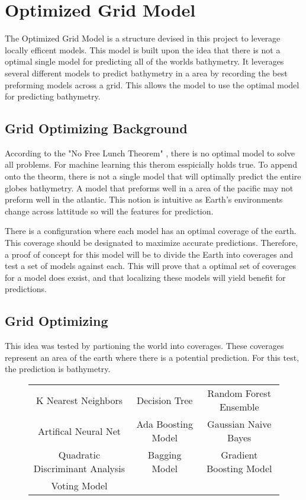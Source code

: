 \section{Optimized Grid Model}
The Optimized Grid Model is a structure devised in this project to leverage locally efficent models.
This model is built upon the idea that there is not a optimal single model for predicting all of the worlds bathymetry.
It leverages several different models to predict bathymetry in a area by recording the best preforming models across a grid.
This allows the model to use the optimal model for predicting bathymetry.

\subsection{Grid Optimizing Background}
According to the "No Free Lunch Theorem" \cite{wolpert1997no}, there is no optimal model to solve all problems.
For machine learning this therom esspicially holds true.
To append onto the theorm, there is not a single model that will optimally predict the entire globes bathymetry.
A model that preforms well in a area of the pacific may not preform well in the atlantic.
This notion is intuitive as Earth's environments change across lattitude so will the features for prediction.


There is a configuration where each model has an optimal coverage of the earth.
This coverage should be designated to maximize accurate predictions.
Therefore, a proof of concept for this model will be to divide the Earth into coverages and test a set of models against each.
This will prove that a optimal set of coverages for a model does exsist, and that localizing these models will yield benefit for predictions.

\subsection{Grid Optimizing}
This idea was tested by partioning the world into coverages.
These coverages represent an area of the earth where there is a potential prediction.
For this test, the prediction is bathymetry.


\begin{center}
    \begin{figure}
        \begin{tabular} { |c|c|c| }
            \hline
                K Nearest Neighbors & Decision Tree & Random Forest Ensemble \\
                Artifical Neural Net & Ada Boosting Model & Gaussian Naive Bayes \\
                Quadratic Discriminant Analysis & Bagging Model & Gradient Boosting Model \\
                Voting Model & &
            \hline
        \end{tabular}
    \end{figure}
\end{center}

